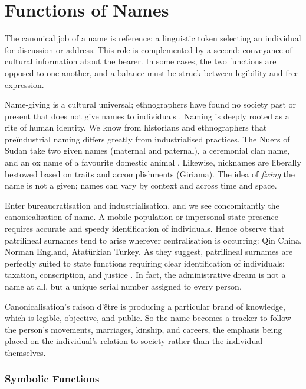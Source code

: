 \section{Functions of Names}

The canonical job of a name is reference: a linguistic token selecting an individual for discussion or address. This role is complemented by a second: conveyance of cultural information about the bearer. In some cases, the two functions are opposed to one another, and a balance must be struck between legibility and free expression.

Name-giving is a cultural universal; ethnographers have found no society past or present that does not give names to individuals \parencite{alford87}. Naming is deeply rooted as a rite of human identity. We know from historians and ethnographers that preïndustrial naming differs greatly from industrialised practices. The Nuers of Sudan take two given names (maternal and paternal), a ceremonial clan name, and an ox name of a favourite domestic animal \parencite{wardhaugh92}. Likewise, nicknames are liberally bestowed based on traits and accomplishments (Giriama). The idea of \textit{fixing} the name is not a given; names can vary by context and across time and space.

Enter bureaucratisation and industrialisation, and we see concomitantly the canonicalisation of name. A mobile population or impersonal state presence requires accurate and speedy identification of individuals. Hence \textcite{scott02} observe that patrilineal surnames tend to arise wherever centralisation is occurring: Qin China, Norman England, Atatürkian Turkey. As they suggest, patrilineal surnames are perfectly suited to state functions requiring clear identification of individuals: taxation, conscription, and justice \parencite[18]{scott02}. In fact, the administrative dream is not a name at all, but a unique serial number assigned to every person.

Canonicalisation's raison d'être is producing a particular brand of knowledge, which is legible, objective, and public. So the name becomes a tracker to follow the person's movements, marriages, kinship, and careers, the emphasis being placed on the individual's relation to society rather than the individual themselves.

\subsubsection{Symbolic Functions}

